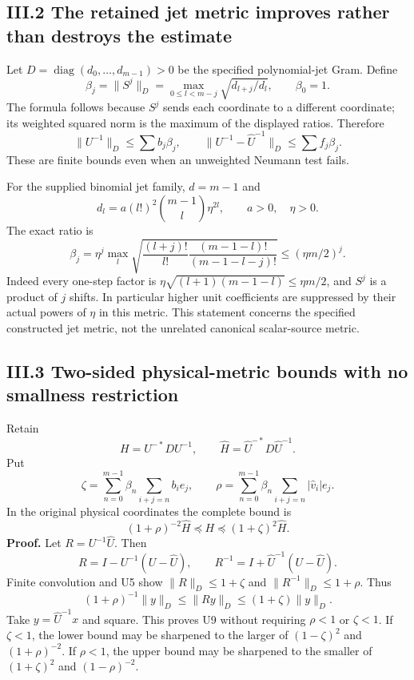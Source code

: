 \documentclass[11pt]{article}
\begin{document}
\subsection{III.2 The retained jet metric improves rather than destroys the estimate}\label{iii.2-the-retained-jet-metric-improves-rather-than-destroys-the-estimate}

Let \(D=\operatorname{diag}(d_0,\ldots,d_{m-1})>0\) be the specified polynomial-jet Gram. Define \[
 \beta_j=\|S^j\|_D
 =\max_{0\le l<m-j}\sqrt{d_{l+j}/d_l},\qquad \beta_0=1.
 \tag{U5}
\] The formula follows because \(S^j\) sends each coordinate to a different coordinate; its weighted squared norm is the maximum of the displayed ratios. Therefore \[
 \|U^{-1}\|_D\le\sum b_j\beta_j,\qquad
 \|U^{-1}-\widehat U^{-1}\|_D\le\sum f_j\beta_j.
 \tag{U6}
\] These are finite bounds even when an unweighted Neumann test fails.

For the supplied binomial jet family, \(d=m-1\) and \[
 d_l=a(l!)^2\binom{m-1}{l}\eta^{2l},\qquad a>0,\quad\eta>0.
\] The exact ratio is \[
 \boxed{\beta_j=\eta^j\max_l
 \sqrt{\frac{(l+j)!}{l!}\frac{(m-1-l)!}{(m-1-l-j)!}}
 \le(\eta m/2)^j.}
 \tag{U7}
\] Indeed every one-step factor is \(\eta\sqrt{(l+1)(m-1-l)}\le\eta m/2\), and \(S^j\) is a product of \(j\) shifts. In particular higher unit coefficients are suppressed by their actual powers of \(\eta\) in this metric. This statement concerns the specified constructed jet metric, not the unrelated canonical scalar-source metric.

\subsection{III.3 Two-sided physical-metric bounds with no smallness restriction}\label{iii.3-two-sided-physical-metric-bounds-with-no-smallness-restriction}

Retain \[
 H=U^{-*}DU^{-1},\qquad
 \widehat H=\widehat U^{-*}D\widehat U^{-1}.
\] Put \[
 \zeta=\sum_{n=0}^{m-1}\beta_n\sum_{i+j=n}b_i e_j,
 \qquad
 \rho=\sum_{n=0}^{m-1}\beta_n\sum_{i+j=n}|\widehat v_i|e_j.
 \tag{U8}
\] In the original physical coordinates the complete bound is \[
 \boxed{(1+\rho)^{-2}\widehat H
 \preceq H\preceq(1+\zeta)^2\widehat H.}
 \tag{U9}
\] \textbf{Proof.} Let \(R=U^{-1}\widehat U\). Then \[
 R=I-U^{-1}(U-\widehat U),\qquad
 R^{-1}=I+\widehat U^{-1}(U-\widehat U).
\] Finite convolution and U5 show \(\|R\|_D\le1+\zeta\) and \(\|R^{-1}\|_D\le1+\rho\). Thus \[
 (1+\rho)^{-1}\|y\|_D\le\|Ry\|_D\le(1+\zeta)\|y\|_D.
\] Take \(y=\widehat U^{-1}x\) and square. This proves U9 without requiring \(\rho<1\) or \(\zeta<1\). If \(\zeta<1\), the lower bound may be sharpened to the larger of \((1-\zeta)^2\) and \((1+\rho)^{-2}\). If \(\rho<1\), the upper bound may be sharpened to the smaller of \((1+\zeta)^2\) and \((1-\rho)^{-2}\).
\end{document}

